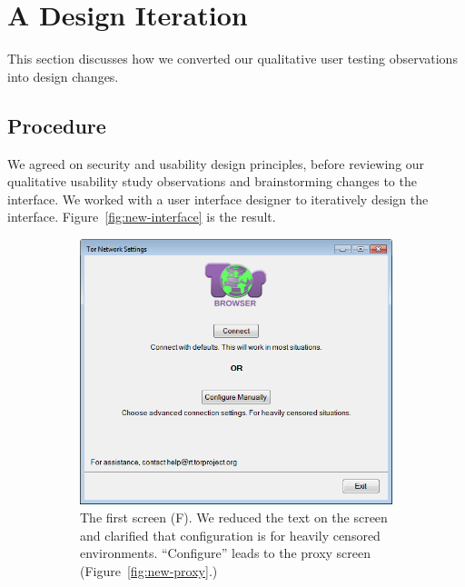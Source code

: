 \documentclass[USenglish,oneside,twocolumn]{article}
\begin{document}
\section{A Design Iteration}
\label{sec:design} 
This section discusses how we converted our qualitative user testing observations into design changes. 

\subsection{Procedure} 
We agreed on security and usability design principles, before reviewing our qualitative usability study observations and brainstorming changes to the interface. We worked with a user interface designer to iteratively design the interface. Figure~\ref{fig:new-interface} is the result.

\begin{figure}
\centering
\begin{subfigure}[b]{0.30\textwidth}
	\includegraphics[width=\textwidth]{screenshots/NEW-first.png}
	\centering\captionsetup{width=1.5\linewidth}%
	\caption{The first screen (F). We reduced the text on the screen and clarified that configuration is for heavily censored environments. ``Configure'' leads to the proxy screen  (Figure~\ref{fig:new-proxy}.)}
	\label{fig:new-first}
\end{subfigure}
~~~~~~~~~~~~~~~~~~~~~~~~~
\begin{subfigure}[b]{0.30\textwidth}

\end{subfigure}
\end{figure}
\end{document}
